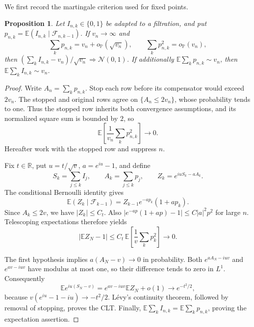 \documentclass[11pt]{article}
\newtheorem{proposition}[theorem]{Proposition}
\theoremstyle{remark}
\theoremstyle{plain}
\newcommand{\E}{\mathbb E}
\newcommand{\Pp}{\mathbb P}
\newcommand{\cF}{\mathcal F}
\begin{document}
We first record the martingale criterion used for fixed points.
\begin{proposition}\label{prop:sp-fixed-martingale}
Let $I_{n,k}\in\{0,1\}$ be adapted to a filtration, and put
$p_{n,k}=\E(I_{n,k}\mid\cF_{n,k-1})$.  If $v_n\to\infty$ and
\[
 \sum_kp_{n,k}=v_n+o_{\Pp}(\sqrt{v_n}),
 \qquad \sum_kp_{n,k}^2=o_{\Pp}(v_n),
\]
then $(\sum_kI_{n,k}-v_n)/\sqrt{v_n}\Longrightarrow\mathcal N(0,1)$.
If additionally $\E\sum_kp_{n,k}\sim v_n$, then
$\E\sum_k I_{n,k}\sim v_n$.
\end{proposition}
\begin{proof}
Write $A_n=\sum_kp_{n,k}$.  Stop each row before its compensator would
exceed $2v_n$.  The stopped and original rows agree on
$\{A_n\le2v_n\}$, whose probability tends to one.  Thus the stopped
row inherits both convergence assumptions, and its normalized square
sum is bounded by $2$, so
\[
 \E\!\left[\frac1{v_n}\sum_kp_{n,k}^2\right]\longrightarrow0.
\]
Hereafter work with the stopped row and suppress $n$.

Fix $t\in\mathbb R$, put $u=t/\sqrt v$, $a=e^{iu}-1$, and define
\[
 S_k=\sum_{j\le k}I_j,\qquad A_k=\sum_{j\le k}p_j,
 \qquad Z_k=e^{iuS_k-aA_k}.
\]
The conditional Bernoulli identity gives
\[
 \E(Z_k\mid\cF_{k-1})
 =Z_{k-1}e^{-ap_k}(1+ap_k).
\]
Since $A_k\le2v$, we have $|Z_k|\le C_t$.  Also
$\lvert e^{-ap}(1+ap)-1\rvert\le C|a|^2p^2$ for large $n$.
Telescoping expectations therefore yields
\[
 |\E Z_N-1|
 \le C_t\,\E\!\left[\frac1v\sum_kp_k^2\right]
 \longrightarrow0.
\]

The first hypothesis implies $a(A_N-v)\to0$ in probability.  Both
$e^{aA_N-iuv}$ and $e^{av-iuv}$ have modulus at most one, so their
difference tends to zero in $L^1$.  Consequently
\[
 \E e^{iu(S_N-v)}
 =e^{av-iuv}\E Z_N+o(1)
 \longrightarrow e^{-t^2/2},
\]
because $v(e^{iu}-1-iu)\to-t^2/2$.  L\'evy's continuity theorem,
followed by removal of stopping, proves the CLT.  Finally,
$\E\sum_kI_{n,k}=\E\sum_kp_{n,k}$, proving the expectation assertion.
\end{proof}
\end{document}
